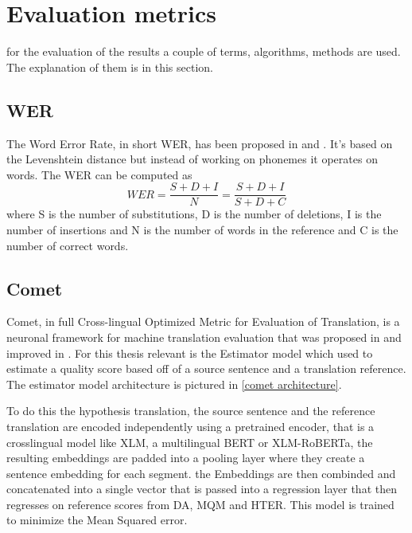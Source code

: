 \section{Evaluation metrics}
 for the evaluation of the results a couple of terms, algorithms, methods are used. The explanation of them is in this section. 
 
\subsection{WER}
\label{wer}
The Word Error Rate, in short WER, has been proposed in \cite{woodard1982} and \cite{morris2004}.
It's based on the Levenshtein distance\cite{Levenshtein1965BinaryCC} but instead of working on phonemes it operates on words.
The WER can be computed as $$WER=\frac{S+D+I}{N}=\frac{S+D+I}{S+D+C}$$ where S is the number of substitutions, D is the number of deletions, I is the number of insertions and N is the number of words in the reference and C is the number of correct words.

\subsection{Comet}
Comet, in full Cross-lingual Optimized Metric for Evaluation of Translation, is a neuronal framework for machine translation evaluation that was proposed in \cite{rei-etal-2020-comet} and improved in \cite{rei-etal-2022-comet}.
For this thesis relevant is the Estimator model which used to estimate a quality score based off of a source sentence and a translation reference. The estimator model architecture is pictured in \autoref{comet architecture}.

To do this the hypothesis translation, the source sentence and the reference translation are encoded independently using a pretrained encoder, that is a crosslingual model like XLM, a multilingual BERT or XLM-RoBERTa, the resulting embeddings are padded into a pooling layer where they create a sentence embedding for each segment. the Embeddings are then combinded and concatenated into a single vector that is passed into a regression layer that then regresses on reference scores from DA, MQM and HTER. 
This model is trained to minimize the Mean Squared error. 

